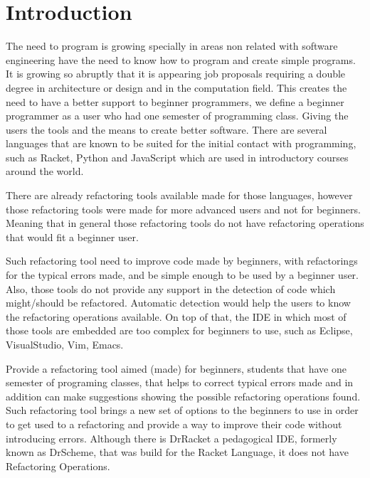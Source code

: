 \section{Introduction}



The need to program is growing specially in areas non related with software engineering %
have the need to know how to program and create simple programs.
It is growing so abruptly that it is appearing job proposals requiring a double degree in
architecture or design and in the computation field. %
This creates the need to have a better support to beginner programmers, we define
a beginner programmer as a user who had one semester of programming class. %
Giving the users the tools and the means to create better software.
There are several languages that are known to be suited for the initial contact
with programming, such as Racket, Python and JavaScript which are used in introductory
courses around the world.

There are already refactoring tools available made for those languages, %
however those refactoring tools were made for more advanced users and not for beginners.
Meaning that in general those refactoring tools do not have refactoring operations that %
would fit a beginner user.

Such refactoring tool need to improve code made by beginners, with refactorings for
the typical errors made, and be simple enough to be used by a beginner user.
Also, those tools do not provide any support in the detection of code which might/should
be refactored.
Automatic detection would help the users to know the refactoring operations available.
On top of that, the IDE in which most of those tools are embedded are too complex for beginners
to use, such as Eclipse, VisualStudio, Vim, Emacs. %

Provide a refactoring tool aimed (made) for beginners, students that have one semester
of programing classes, that helps to correct typical errors made and in addition can
make suggestions showing the possible refactoring operations found.
Such refactoring tool brings a new set of options to the beginners to use
in order to get used to a refactoring and provide a way to improve their code
without introducing errors.
Although there is DrRacket a pedagogical IDE, formerly known as DrScheme, that was
build for the Racket Language, it does not have Refactoring Operations.

